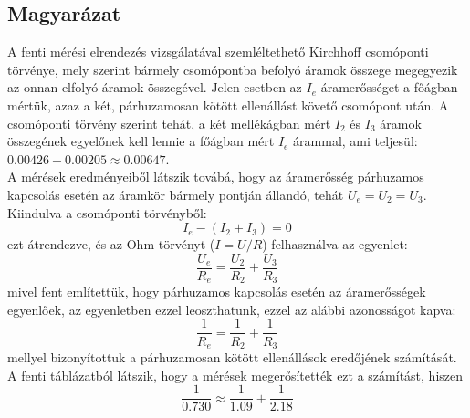 \documentclass[10pt, conference,a4paper]{ITKproc}
\begin{document}
\subsection{Magyarázat}
A fenti mérési elrendezés vizsgálatával szemléltethető Kirchhoff csomóponti törvénye, mely szerint bármely csomópontba befolyó áramok összege megegyezik az onnan elfolyó áramok összegével. Jelen esetben az $I_e$ áramerősséget a főágban mértük, azaz a két, párhuzamosan kötött ellenállást követő csomópont után. A csomóponti törvény szerint tehát, a két mellékágban mért $I_2$ és $I_3$ áramok összegének egyelőnek kell lennie a főágban mért $I_e$ árammal, ami teljesül: $0.00426 + 0.00205 \approx 0.00647$. \\
A mérések eredményeiből látszik továbá, hogy az áramerősség párhuzamos kapcsolás esetén az áramkör bármely pontján állandó, tehát $U_e = U_2 = U_3$. Kiindulva a csomóponti törvényből:
\[I_e-(I_2 + I_3) = 0\] ezt átrendezve, és az Ohm törvényt ($I = U/R$) felhasználva az egyenlet: \[\frac{U_e}{R_e} = \frac{U_2}{R_2} + \frac{U_3}{R_3}\] mivel fent említettük, hogy párhuzamos kapcsolás esetén az áramerősségek egyenlőek, az egyenletben ezzel leoszthatunk, ezzel az alábbi azonosságot kapva: \[\frac{1}{R_e} = \frac{1}{R_2} + \frac{1}{R_3}\] mellyel bizonyítottuk a párhuzamosan kötött ellenállások eredőjének számítását. A fenti táblázatból látszik, hogy a mérések megerősítették ezt a számítást, hiszen \[\frac{1}{0.730} \approx \frac{1}{1.09} + \frac{1}{2.18}\]











%


\end{document}
